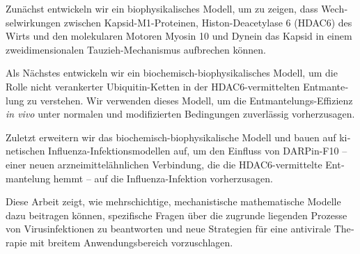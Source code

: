 \begin{otherlanguage}{ngerman}
Zunächst entwickeln wir ein biophysikalisches Modell, um zu zeigen, dass Wechselwirkungen zwischen Kapsid-M1-Proteinen, Histon-Deacetylase 6 (HDAC6) des Wirts und den molekularen Motoren Myosin 10 und Dynein das Kapsid in einem zweidimensionalen Tauzieh-Mechanismus aufbrechen können.  

Als Nächstes entwickeln wir ein biochemisch-biophysikalisches Modell, um die Rolle nicht verankerter Ubiquitin-Ketten in der HDAC6-vermittelten Entmantelung zu verstehen. Wir verwenden dieses Modell, um die Entmantelungs-Effizienz \textit{in vivo} unter normalen und modifizierten Bedingungen zuverlässig vorherzusagen.

Zuletzt erweitern wir das biochemisch-biophysikalische Modell und bauen auf kinetischen Influenza-Infektionsmodellen auf, um den Einfluss von DARPin-F10 – einer neuen arzneimittelähnlichen Verbindung, die die HDAC6-vermittelte Entmantelung hemmt – auf die Influenza-Infektion vorherzusagen. 

Diese Arbeit zeigt, wie mehrschichtige, mechanistische mathematische Modelle dazu beitragen können, spezifische Fragen über die zugrunde liegenden Prozesse von Virusinfektionen zu beantworten und neue Strategien für eine antivirale Therapie mit breitem Anwendungsbereich vorzuschlagen.

\end{otherlanguage}

\endgroup

\vfill